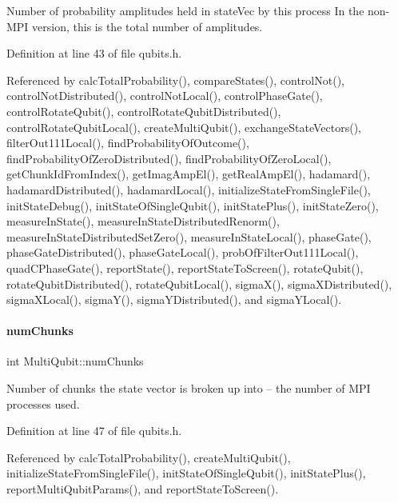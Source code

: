 Number of probability amplitudes held in state\+Vec by this process In the non-\/\+M\+PI version, this is the total number of amplitudes. 



Definition at line 43 of file qubits.\+h.



Referenced by calc\+Total\+Probability(), compare\+States(), control\+Not(), control\+Not\+Distributed(), control\+Not\+Local(), control\+Phase\+Gate(), control\+Rotate\+Qubit(), control\+Rotate\+Qubit\+Distributed(), control\+Rotate\+Qubit\+Local(), create\+Multi\+Qubit(), exchange\+State\+Vectors(), filter\+Out111\+Local(), find\+Probability\+Of\+Outcome(), find\+Probability\+Of\+Zero\+Distributed(), find\+Probability\+Of\+Zero\+Local(), get\+Chunk\+Id\+From\+Index(), get\+Imag\+Amp\+El(), get\+Real\+Amp\+El(), hadamard(), hadamard\+Distributed(), hadamard\+Local(), initialize\+State\+From\+Single\+File(), init\+State\+Debug(), init\+State\+Of\+Single\+Qubit(), init\+State\+Plus(), init\+State\+Zero(), measure\+In\+State(), measure\+In\+State\+Distributed\+Renorm(), measure\+In\+State\+Distributed\+Set\+Zero(), measure\+In\+State\+Local(), phase\+Gate(), phase\+Gate\+Distributed(), phase\+Gate\+Local(), prob\+Of\+Filter\+Out111\+Local(), quad\+C\+Phase\+Gate(), report\+State(), report\+State\+To\+Screen(), rotate\+Qubit(), rotate\+Qubit\+Distributed(), rotate\+Qubit\+Local(), sigma\+X(), sigma\+X\+Distributed(), sigma\+X\+Local(), sigma\+Y(), sigma\+Y\+Distributed(), and sigma\+Y\+Local().

\mbox{\label{structMultiQubit_acd43f2f57991709c9e94f73662c972b2}} 
\paragraph{\texorpdfstring{num\+Chunks}{numChunks}}
{\footnotesize\ttfamily int Multi\+Qubit\+::num\+Chunks}



Number of chunks the state vector is broken up into -- the number of M\+PI processes used. 



Definition at line 47 of file qubits.\+h.



Referenced by calc\+Total\+Probability(), create\+Multi\+Qubit(), initialize\+State\+From\+Single\+File(), init\+State\+Of\+Single\+Qubit(), init\+State\+Plus(), report\+Multi\+Qubit\+Params(), and report\+State\+To\+Screen().


